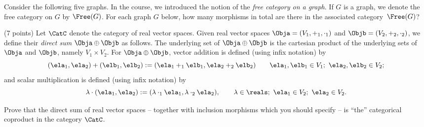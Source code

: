 \documentclass[paper=8.125in:10.250in,pagesize=pdftex,
    headinclude=false,footinclude=false,oneside,egregdoesnotlikesansseriftitles]{kaobook}
\begin{document}
\newpage



\begin{gradedexercise}\label{ex:FreeCatOnGraph}
 Consider the following five graphs. In the course, we introduced the notion of the \emph{free category on a graph}. If $G$ is a graph, we denote the free category on $G$ by $\Free(G)$. For each graph $G$ below, how many morphisms in total are there in the associated category~$\Free(G)$?

  \begin{center}
  \end{center}
\end{gradedexercise}


\newpage


\begin{gradedexercise}\label{ex:DirectSumCopr}
(7 points) Let $\CatC$ denote the category of real vector spaces. Given real vector spaces $\Obja = (V_1, +_1, \cdot_1)$ and $\Objb = (V_2, +_2, \cdot_2)$, we define their \emph{direct sum} $\Obja \oplus \Objb$ as follows. 
The underlying set of $\Obja \oplus \Objb$ is the cartesian product of the underlying sets of $\Obja$ and $\Objb$, namely $V_1 \times V_2$. For $\Obja \oplus \Objb$, vector addition is defined (using infix notation) by
$$(\ela_1, \ela_2) + (\elb_1, \elb_2) := (\ela_1 +_1 \elb_1, \ela_2 +_2 \elb_2) \quad \quad \ela_1, \elb_1 \in V_1; \ \ela_2, \elb_2 \in V_2;$$
and scalar multiplication is defined (using infix notation) by
$$\lambda \cdot (\ela_1, \ela_2) := (\lambda \cdot_1 \ela_1, \lambda \cdot_2 \ela_2), \quad \quad \lambda \in \reals; \ \ela_1 \in V_2; \ \ela_2 \in V_2.$$

Prove that the direct sum of real vector spaces -- together with inclusion morphisms which you should specify -- is ``the'' categorical coproduct in the category $\CatC$. 
\end{gradedexercise}


\newpage
\end{document}
